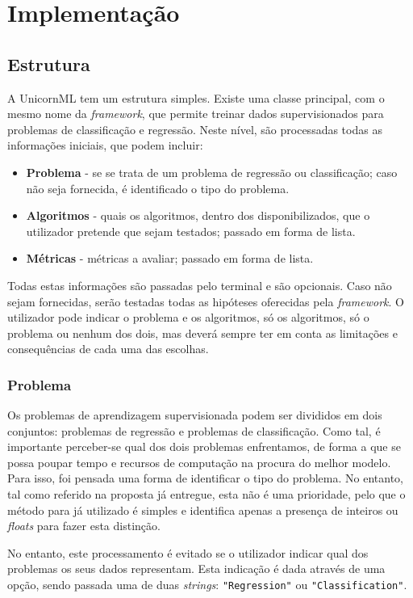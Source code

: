 \documentclass[a4paper]{report}
\begin{document}
\chapter{Implementação} \label{ch:Implementation}
\large {
	\section{Estrutura} \label{sec:A}
	A UnicornML tem um estrutura simples. Existe uma classe principal, com o mesmo nome da \textit{framework}, que permite treinar dados supervisionados para problemas de classificação e regressão.
	Neste nível, são processadas todas as informações iniciais, que podem incluir:
	\begin{itemize}
		\item \textbf{Problema} - se se trata de um problema de regressão ou classificação; caso não seja fornecida, é identificado o tipo do problema.
		\item \textbf{Algoritmos} - quais os algoritmos, dentro dos disponibilizados, que o utilizador pretende que sejam testados; passado em forma de lista.
		\item \textbf{Métricas} - métricas a avaliar; passado em forma de lista.
	\end{itemize}

	Todas estas informações são passadas pelo terminal e são opcionais. Caso não sejam fornecidas, serão testadas todas as hipóteses oferecidas pela \textit{framework}.
	O utilizador pode indicar o problema e os algoritmos, só os algoritmos, só o problema ou nenhum dos dois, mas deverá sempre ter em conta as limitações e consequências de cada uma das escolhas.


		\subsection{Problema} \label{subsec:A-1}
		Os problemas de aprendizagem supervisionada podem ser divididos em dois conjuntos: problemas de regressão e problemas de classificação. 
		Como tal, é importante perceber-se qual dos dois problemas enfrentamos, de forma a que se possa poupar tempo e recursos de computação na procura do melhor modelo.
		Para isso, foi pensada uma forma de identificar o tipo do problema. No entanto, tal como referido na proposta já entregue, esta não é uma prioridade, 
		pelo que o método para já utilizado é simples e identifica apenas a presença de inteiros ou \textit{floats} para fazer esta distinção.

		No entanto, este processamento é evitado se o utilizador indicar qual dos problemas os seus dados representam. 
		Esta indicação é dada através de uma opção, sendo passada uma de duas \textit{strings}: \texttt{"Regression"} ou \texttt{"Classification"}.

}
\end{document}
